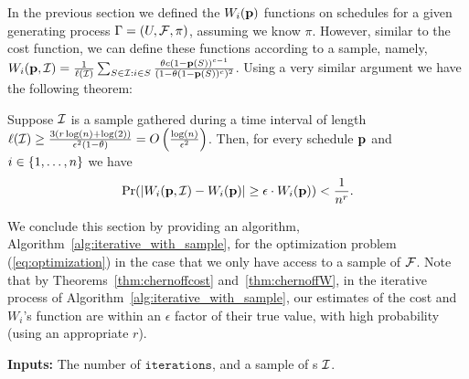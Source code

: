 In the previous section we defined the $W_i(\p)$ functions on schedules for a given generating process $\sys=(U,\F,\pi)$, assuming we know $\pi$. However, similar to the cost function, we can define these functions according to a sample, namely, 
$W_i(\p,\S) = \frac{1}{\ell(\S)}\sum_{S\in \S: i\in S} \frac{\theta c (1-\p(S))^{c-1}}{(1-\theta(1-\p(S))^c)^2}$.
Using a very similar argument we have the following theorem:
\begin{theorem}\label{thm:chernoffW}
 Suppose $\S$ is a sample gathered during a time interval of length $\ell(\S) \geq \frac{3(r\log(n)+\log(2))}{\epsilon^2(1-\theta)} = O\paran{\frac{\log(n)}{\epsilon^2}}$. Then, for every schedule $\p$ and $i\in\set{1,\dots,n}$ we have
 $$\pr(|W_i(\p,\S) - W_i(\p)|\geq \epsilon\cdot W_i(\p)) < \frac{1}{n^r}.$$
\end{theorem}

We conclude this section by providing an algorithm, Algorithm~\ref{alg:iterative_with_sample}, for the optimization problem (\ref{eq:optimization}) in the case that we only have access to a sample of $\F$. Note that by Theorems~\ref{thm:chernoffcost} and~\ref{thm:chernoffW}, in the iterative process of Algorithm~\ref{alg:iterative_with_sample}, our estimates of the cost and $W_i$'s function are within an $\epsilon$ factor of their true value, with high probability (using an appropriate $r$).

\begin{algorithm}[!h]
\BlankLine
{\bf Inputs:} The number of  $\texttt{iterations}$, and a sample of {\ins}s $\S$.

\caption{$\appoptimizer(\texttt{iterations},\S)$}\label{alg:iterative_with_sample}
\end{algorithm}  








